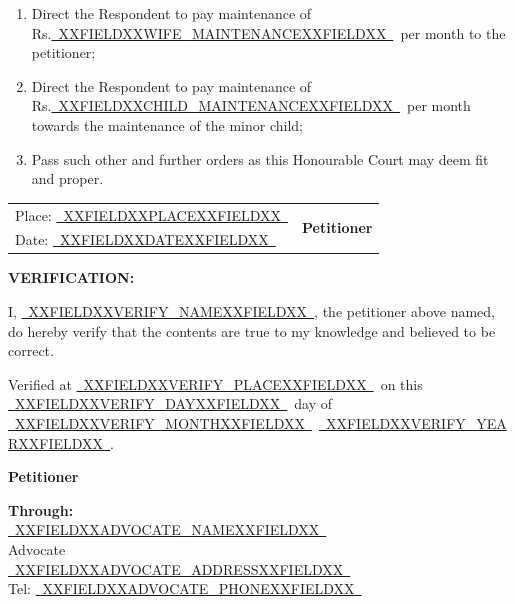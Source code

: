 \documentclass[12pt,a4paper]{article}
\newcommand{\fillline}[1]{\underline{~#1~}}
\begin{document}
\begin{enumerate}[leftmargin=*, label=(\alph*), itemsep=6pt, topsep=4pt]
  \item Direct the Respondent to pay maintenance of Rs.\fillline{XXFIELDXXWIFE_MAINTENANCEXXFIELDXX}\ per month
        to the petitioner;
  \item Direct the Respondent to pay maintenance of Rs.\fillline{XXFIELDXXCHILD_MAINTENANCEXXFIELDXX}\ per month
        towards the maintenance of the minor child;
  \item Pass such other and further orders as this Honourable Court may
        deem fit and proper.
\end{enumerate}

\vspace{20pt}

\begin{tabular}{@{}p{8cm}p{6cm}@{}}
  Place: \fillline{XXFIELDXXPLACEXXFIELDXX} & \multirow{2}{*}{\textbf{Petitioner}} \\[8pt]
  Date: \fillline{XXFIELDXXDATEXXFIELDXX}  & \\
\end{tabular}

\vspace{20pt}

\textbf{VERIFICATION:}

I, \fillline{XXFIELDXXVERIFY_NAMEXXFIELDXX}, the petitioner above named, do hereby verify that the
contents are true to my knowledge and believed to be correct.

\vspace{10pt}
Verified at \fillline{XXFIELDXXVERIFY_PLACEXXFIELDXX}\ on this \fillline{XXFIELDXXVERIFY_DAYXXFIELDXX}\ day of \fillline{XXFIELDXXVERIFY_MONTHXXFIELDXX}\ \fillline{XXFIELDXXVERIFY_YEARXXFIELDXX}.

\vspace{20pt}
\hfill \textbf{Petitioner}

\vspace{20pt}

\textbf{Through:}\\[6pt]
\fillline{XXFIELDXXADVOCATE_NAMEXXFIELDXX}\\
Advocate\\
\fillline{XXFIELDXXADVOCATE_ADDRESSXXFIELDXX}\\
Tel: \fillline{XXFIELDXXADVOCATE_PHONEXXFIELDXX}
\end{document}
